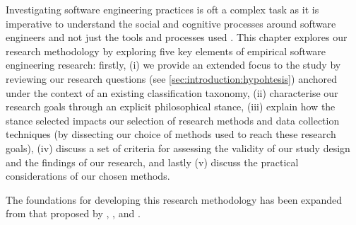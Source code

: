 \label{sec:research-methodology:preface}

Investigating software engineering practices is oft a complex task as it is imperative to understand the social and cognitive processes around software engineers and not just the tools and processes used \citep{Easterbrook:2007ws}. This chapter explores our research methodology by exploring five key elements of empirical software engineering research: firstly, (i) we provide an extended focus to the study by reviewing our research questions (see \cref{sec:introduction:hypohtesis}) anchored under the context of an existing classification taxonomy, (ii) characterise our research goals through an explicit philosophical stance, (iii) explain how the stance selected impacts our selection of research methods and data collection techniques (by dissecting our choice of methods used to reach these research goals), (iv) discuss a set of criteria for assessing the validity of our study design and the findings of our research, and lastly (v) discuss the practical considerations of our chosen methods. 

The foundations for developing this research methodology has been expanded from that proposed by \citet{Easterbrook:2007ws}, \citet{Wohlin:2014jq}, \citet{Wohlin:2012bu} and \citet{Shaw:2003aa}.